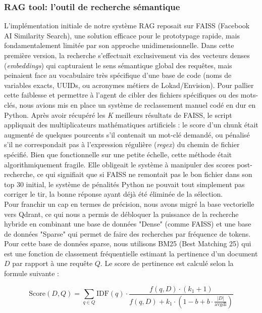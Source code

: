 \subsubsection{RAG tool: l'outil de recherche sémantique}

L’implémentation initiale de notre système RAG reposait sur FAISS (Facebook AI Similarity Search), une solution efficace pour le prototypage rapide, mais fondamentalement limitée par son approche unidimensionnelle. Dans cette première version, la recherche s'effectuait exclusivement via des vecteurs denses (\textit{embeddings}) qui capturaient le sens sémantique global des requêtes, mais peinaient face au vocabulaire très spécifique d'une base de code (noms de variables exacts, UUIDs, ou acronymes métiers de Lokad/Envision). Pour pallier cette faiblesse et permettre à l'agent de cibler des fichiers spécifiques ou des mots-clés, nous avions mis en place un système de reclassement manuel codé en dur en Python. Après avoir récupéré les \textit{K} meilleurs résultats de FAISS, le script appliquait des multiplicateurs mathématiques artificiels : le score d'un chunk était augmenté de quelques pourcents s'il contenait un mot-clé demandé, ou pénalisé s'il ne correspondait pas à l'expression régulière (\textit{regex}) du chemin de fichier spécifié. Bien que fonctionnelle sur une petite échelle, cette méthode était algorithmiquement fragile. Elle obligeait le système à manipuler des scores post-recherche, ce qui signifiait que si FAISS ne remontait pas le bon fichier dans son top 30 initial, le système de pénalités Python ne pouvait tout simplement pas corriger le tir, la bonne réponse ayant déjà été éliminée de la sélection.\\

Pour franchir un cap en termes de précision, nous avons migré la base vectorielle vers Qdrant, ce qui nous a permis de débloquer la puissance de la recherche hybride en combinant une base de données "Dense" (comme FAISS) et une base de données "Sparse" qui permet de faire des recherches par fréquence de tokens. Pour cette base de données sparse, nous utilisons BM25 (Best Matching 25) \cite{Robertson2009} qui est une fonction de classement fréquentielle estimant la pertinence d'un document $D$ par rapport à une requête $Q$. Le score de pertinence est calculé selon la formule suivante :

\begin{equation}
\text{Score}(D, Q) = \sum_{q \in Q} \text{IDF}(q) \cdot \frac{f(q, D) \cdot (k_1 + 1)}{f(q, D) + k_1 \cdot (1 - b + b \cdot \frac{|D|}{\text{avgdl}})}
\end{equation}

